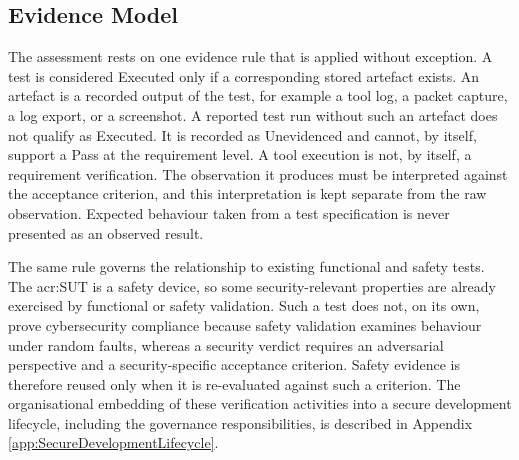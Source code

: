 \subsection{Evidence Model} 
\label{subsec:evidence_model} 

The assessment rests on one evidence rule that is applied without exception. A test is considered Executed only if a corresponding stored artefact exists. An artefact is a recorded output of the test, for example a tool log, a packet capture, a log export, or a screenshot. A reported test run without such an artefact does not qualify as Executed. It is recorded as Unevidenced and cannot, by itself, support a Pass at the requirement level. A tool execution is not, by itself, a requirement verification. The observation it produces must be interpreted against the acceptance criterion, and this interpretation is kept separate from the raw observation. Expected behaviour taken from a test specification is never presented as an observed result. 

The same rule governs the relationship to existing functional and safety tests. The \gls{acr:SUT} is a safety device, so some security-relevant properties are already exercised by functional or safety validation. Such a test does not, on its own, prove cybersecurity compliance because safety validation examines behaviour under random faults, whereas a security verdict requires an adversarial perspective and a security-specific acceptance criterion. Safety evidence is therefore reused only when it is re-evaluated against such a criterion. The organisational embedding of these verification activities into a secure development lifecycle, including the governance responsibilities, is described in Appendix \ref{app:SecureDevelopmentLifecycle}.
